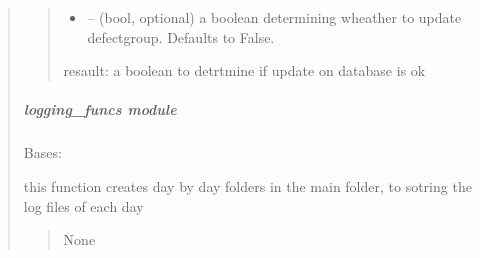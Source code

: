 \documentclass[letterpaper,10pt,english]{sphinxmanual}
\begin{document}
\begin{quote}
\begin{savenotes}
\begin{fulllineitems}
\begin{quote}
\begin{description}
\begin{itemize}
\item {} 
\sphinxAtStartPar
{} – (bool, optional) a boolean determining wheather to update defect\sphinxhyphen{}group. Defaults to False.

\end{itemize}

\sphinxAtStartPar
resault: a boolean to detrtmine if update on database is ok

\end{description}\end{quote}

\end{fulllineitems}\end{savenotes}


\sphinxstepscope


\subparagraph{logging\_funcs module}
\label{\detokenize{setting/backend/logging_funcs:module-oxin.backend.logging_funcs}}\label{\detokenize{setting/backend/logging_funcs:logging-funcs-module}}\label{\detokenize{setting/backend/logging_funcs::doc}}

\begin{savenotes}\begin{fulllineitems}
\label{\detokenize{setting/backend/logging_funcs:oxin.backend.logging_funcs.app_logger}}
\pysigstartsignatures
{}
\pysigstopsignatures
\sphinxAtStartPar
Bases: 

\begin{savenotes}\begin{fulllineitems}
\label{\detokenize{setting/backend/logging_funcs:oxin.backend.logging_funcs.app_logger.create_dailyfolder}}
\pysigstartsignatures
{}
\pysigstopsignatures
\sphinxAtStartPar
this function creates day by day folders in the main folder, to sotring the log files of each day
\begin{quote}\begin{description}
\sphinxAtStartPar
None


\end{description}
\end{quote}
\end{fulllineitems}
\end{savenotes}
\end{fulllineitems}
\end{savenotes}
\end{quote}
\end{document}
